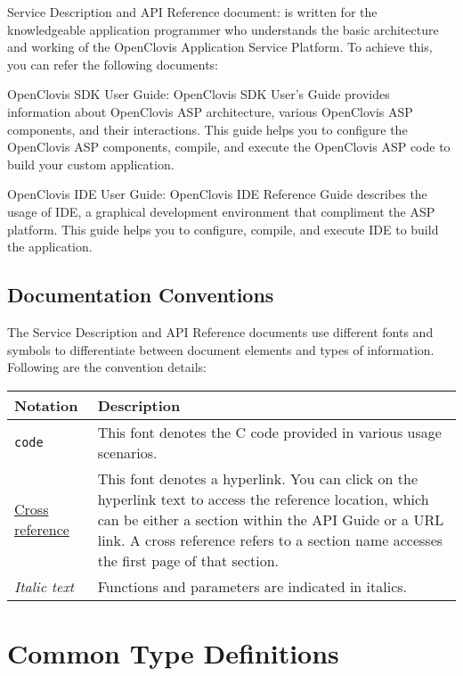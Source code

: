\begin{flushleft}
Service Description and API Reference document: is written for the knowledgeable application programmer 
who understands the basic architecture and working of the OpenClovis Application Service Platform. 
To achieve this, you can refer the following documents:
\par
OpenClovis SDK User Guide: OpenClovis SDK User's Guide provides information about OpenClovis ASP
architecture, various OpenClovis ASP components, and their interactions. This
guide helps you to configure the OpenClovis ASP components, compile, and
execute the OpenClovis ASP code to build your custom application.
\par
OpenClovis IDE User Guide: OpenClovis IDE Reference Guide describes the usage of IDE, a graphical
development environment that compliment the ASP platform. This guide helps
you to configure, compile, and execute IDE to build the application.
\end{flushleft}


\section{Documentation Conventions}
\begin{flushleft}
The Service Description and API Reference documents use different fonts and symbols to differentiate between document elements and types of information. 
Following are the convention details:
\newline\newline
\begin{tabular}{|p{2in}|p{4in}|} \hline
\textbf{Notation}&\textbf{Description}\\\hline
\tt{code} &This font denotes the C code provided in various usage scenarios.\\
\hyperlink {pagebuf102}{Cross reference} &This font denotes a hyperlink. You can click on the hyperlink text to access the reference location,
which can be either a section within the 
API Guide or a URL link. A cross reference refers to a section name accesses the first page of that section.
\\ 
\textit{Italic text} &Functions and parameters are indicated in italics.\\\hline
\end{tabular}

\end{flushleft}




\chapter{Common Type Definitions}
